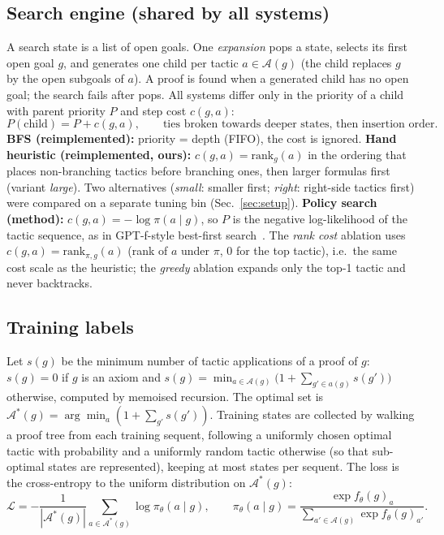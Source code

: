 \subsection{Search engine (shared by all systems)}
A search state is a list of open goals. One \emph{expansion} pops a state, selects its first open goal $g$, and generates one child per tactic $a\in\mathcal{A}(g)$ (the child replaces $g$ by the open subgoals of $a$). A proof is found when a generated child has no open goal; the search fails after  pops. All systems differ only in the priority of a child with parent priority $P$ and step cost $c(g,a)$:
\begin{equation}
P(\text{child}) = P + c(g,a),\qquad \text{ties broken towards deeper states, then insertion order.}
\end{equation}
\textbf{BFS (reimplemented):} priority = depth (FIFO), the cost is ignored.
\textbf{Hand heuristic (reimplemented, ours):} $c(g,a)=\mathrm{rank}_g(a)$ in the ordering that places non-branching tactics before branching ones, then larger formulas first (variant \emph{large}). Two alternatives (\emph{small}: smaller first; \emph{right}: right-side tactics first) were compared on a separate tuning bin (Sec.~\ref{sec:setup}).
\textbf{Policy search (method):} $c(g,a)=-\log\pi(a\mid g)$, so $P$ is the negative log-likelihood of the tactic sequence, as in GPT-f-style best-first search~\cite{polu2020generative}. The \emph{rank cost} ablation uses $c(g,a)=\mathrm{rank}_{\pi,g}(a)$ (rank of $a$ under $\pi$, 0 for the top tactic), i.e.\ the same cost scale as the heuristic; the \emph{greedy} ablation expands only the top-1 tactic and never backtracks.

\subsection{Training labels}
Let $s(g)$ be the minimum number of tactic applications of a proof of $g$: $s(g)=0$ if $g$ is an axiom and $s(g)=\min_{a\in\mathcal{A}(g)}\bigl(1+\sum_{g'\in a(g)}s(g')\bigr)$ otherwise, computed by memoised recursion. The optimal set is $\mathcal{A}^*(g)=\arg\min_a(1+\sum_{g'}s(g'))$. Training states are collected by walking a proof tree from each training sequent, following a uniformly chosen optimal tactic with probability  and a uniformly random tactic otherwise (so that sub-optimal states are represented), keeping at most  states per sequent. The loss is the cross-entropy to the uniform distribution on $\mathcal{A}^*(g)$:
\begin{equation}
\mathcal{L}=-\frac{1}{|\mathcal{A}^*(g)|}\sum_{a\in\mathcal{A}^*(g)}\log\pi_\theta(a\mid g),\qquad \pi_\theta(a\mid g)=\frac{\exp f_\theta(g)_a}{\sum_{a'\in\mathcal{A}(g)}\exp f_\theta(g)_{a'}}.
\end{equation}

